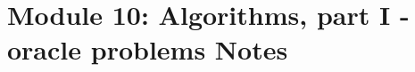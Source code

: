 \section{Module 10: Algorithms, part I - oracle problems Notes}


\begin{comment}

\section{Module 1 Quantum Strangeness}


\section{Module 2 Quantum Linear Algebra, Part I}


\section{Module 3 The Single Qubit}


\section{Module 4: Quantum linear algebra, part II}


\section{Module 5: Multiple qubits, part I}


\section{Module 6: Multiple qubits, part II}


\section{Module 7: Interlude: Principles of quantum mechanics}


\section{Module 8: Quantum circuits - reversible construction}


%


\end{comment}
